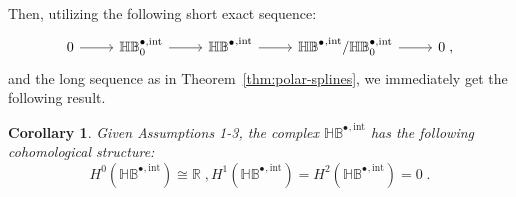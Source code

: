 \documentclass[10pt]{article}
\newcommand{\RR}{{\mathbb{R}}}
\newcommand{\isomorphic}{\cong}
\newcommand{\vSpace}[1]{\mathbb{#1}}
\newcommand{\complex}[1]{\mathit{\vSpace{#1}^\bullet}}
\newcommand{\bsp}{B}
\newcommand{\tint}{\mathrm{int}}
\newcommand{\hintComplex}{\complex{H\bsp}^{,\tint}}
\newcommand{\hintComplexZ}{\vSpace{H\bsp}^{\bullet,\tint}_0}
\theoremstyle{plain}
\newtheorem{corollary}{Corollary}[section]
\theoremstyle{definition}
\theoremstyle{remark}
\begin{document}
Then, utilizing the following short exact sequence:
\begin{equation*}
    \begin{tikzcd}
        0 \arrow{r} & \hintComplexZ \arrow{r}{} & \hintComplex \arrow{r}{} & \hintComplex / \hintComplexZ  \arrow{r} & 0\;,
    \end{tikzcd}
\end{equation*}
and the long sequence as in Theorem~\ref{thm:polar-splines}, we immediately get the following result.
\begin{corollary}\label{cor:exactness-intermediate-complex}
    Given Assumptions 1-3, the complex $\hintComplex$ has the following cohomological structure:
    \begin{equation*}
        H^0(\hintComplex) \isomorphic \RR\;,
        H^1(\hintComplex) = H^2(\hintComplex) =  0\;.
    \end{equation*}
\end{corollary}
\end{document}
